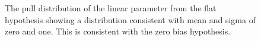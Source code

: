 \begin{figure}[h!]
  \centering
  ~~
  \\
  ~~
  \\
  \caption{\label{fig:pulls} 
  The pull distribution of the linear parameter from the flat hypothesis showing
  a distribution consistent with mean and sigma of zero and one. 
  This is consistent with the zero bias hypothesis.
}
\end{figure}

